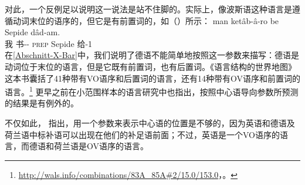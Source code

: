 对此，一个反例足以说明这一说法是站不住脚的。实际上，像波斯语这种语言是遵循动词末位的语序的，但它是有前置词的，如（）所示：
\ea
\gll man ketâb-â-ro be Sepide dâd-am.\\
     我 书-\pl-\RA{} \textsc{prep} Sepide  给-1\sg\\
\z
在\ref{Abschnitt-X-Bar}中，我们说明了德语不能简单地按照这一参数来描写：德语是动词位于末位的语言，但是它既有前置词，也有后置词。《语言结构的世界地图》这本书囊括了41种带有VO语序和后置词的语言，还有14种带有OV语序和前置词的语言\citep{wals-83,wals-85}。\footnote{%
  \url{http://wals.info/combinations/83A_85A\#2/15.0/153.0}，。
} \citet{Dryer92a}更早之前在小范围样本的语言研究中也指出，按照中心语导向参数所预测的结果是有例外的。

不仅如此， \citet[]{GW94a}指出，用一个参数来表示中心语的位置是不够的，因为英语和德语及荷兰语中标补语可以出现在他们的补足语前面；不过，英语是一个VO语序的语言，而德语和荷兰语是OV语序的语言。

